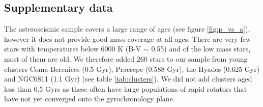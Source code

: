 \documentclass[10pt,preprint]{aastex}
\newcommand{\prot}{$P_{rot}~$}
\begin{document}
\subsection{Supplementary data}

The asteroseismic sample covers a large range of ages (see figure \ref{fig:p_vs_a}), however it does not provide good mass coverage at all ages.
There are very few stars with temperatures below 6000 K (B-V $\sim$ 0.55) and of the low mass stars, most of them are old.
We therefore added 260 stars to our sample from young clusters Coma Berenices (0.5 Gyr), Praesepe (0.588 Gyr), the Hyades (0.625 Gyr) and NGC6811 (1.1 Gyr) (see table \ref{tab:clusters}).
We did not add clusters aged less than 0.5 Gyrs as these often have large populations of rapid rotators that have not yet converged onto the gyrochronology plane.

\end{document}
